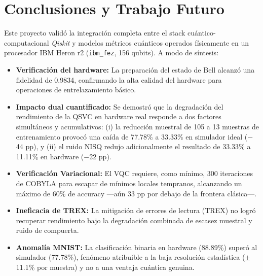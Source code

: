 \section{Conclusiones y Trabajo Futuro}
\label{sec:conclusiones}

Este proyecto valid\'o la integraci\'on completa entre el stack cu\'antico-computacional \textit{Qiskit} y modelos m\'etricos cu\'anticos operados f\'isicamente en un procesador IBM Heron r2 (\texttt{ibm\_fez}, 156 qubits). A modo de s\'intesis:

\begin{itemize}
    \item \textbf{Verificaci\'on del hardware:} La preparaci\'on del estado de Bell alcanz\'o una fidelidad de 0.9834, confirmando la alta calidad del hardware para operaciones de entrelazamiento b\'asico.
    \item \textbf{Impacto dual cuantificado:} Se demostr\'o que la degradaci\'on del rendimiento de la QSVC en hardware real responde a dos factores simult\'aneos y acumulativos: (i) la reducci\'on muestral de 105 a 13 muestras de entrenamiento provoc\'o una ca\'ida de 77.78\% a 33.33\% en simulador ideal ($-$44 pp), y (ii) el ruido NISQ redujo adicionalmente el resultado de 33.33\% a 11.11\% en hardware ($-$22 pp).
    \item \textbf{Verificaci\'on Variacional:} El VQC requiere, como m\'inimo, 300 iteraciones de COBYLA para escapar de m\'inimos locales tempranos, alcanzando un m\'aximo de 60\% de accuracy ---a\'un 33 pp por debajo de la frontera cl\'asica---.
    \item \textbf{Ineficacia de TREX:} La mitigaci\'on de errores de lectura (TREX) no logr\'o recuperar rendimiento bajo la degradaci\'on combinada de escasez muestral y ruido de compuerta.
    \item \textbf{Anomal\'ia MNIST:} La clasificaci\'on binaria en hardware (88.89\%) super\'o al simulador (77.78\%), fen\'omeno atribuible a la baja resoluci\'on estad\'istica ($\pm$11.1\% por muestra) y no a una ventaja cu\'antica genuina.
\end{itemize}

